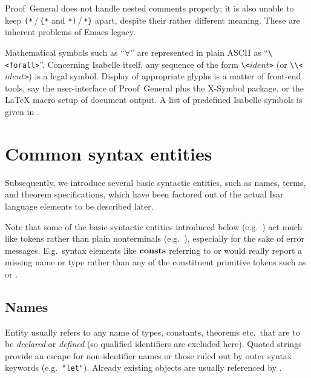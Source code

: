\begin{warn}
  Proof~General does not handle nested comments properly; it is also unable to
  keep \verb,(*,\,/\,\verb,{*, and \verb,*),\,/\,\verb,*}, apart, despite
  their rather different meaning.  These are inherent problems of Emacs
  legacy.
\end{warn}

\medskip

Mathematical symbols such as ``$\forall$'' are represented in plain ASCII as
``\verb,\<forall>,''.  Concerning Isabelle itself, any sequence of the form
\verb,\<,$ident$\verb,>, (or \verb,\\<,$ident$\verb,>,) is a legal symbol.
Display of appropriate glyphs is a matter of front-end tools, say the
user-interface of Proof~General plus the X-Symbol package, or the {\LaTeX}
macro setup of document output.  A list of predefined Isabelle symbols is
given in \cite[appendix~A]{isabelle-sys}.


\section{Common syntax entities}

Subsequently, we introduce several basic syntactic entities, such as names,
terms, and theorem specifications, which have been factored out of the actual
Isar language elements to be described later.

Note that some of the basic syntactic entities introduced below (e.g.\ 
) act much like tokens rather than plain nonterminals (e.g.\ 
), especially for the sake of error messages.  E.g.\ syntax
elements like ${\mathord{\mathbf{consts}}}$ referring to \railqtoken{name} or \railqtoken{type}
would really report a missing name or type rather than any of the constituent
primitive tokens such as \railtoken{ident} or \railtoken{string}.


\subsection{Names}

Entity  usually refers to any name of types, constants,
theorems etc.\ that are to be \emph{declared} or \emph{defined} (so qualified
identifiers are excluded here).  Quoted strings provide an escape for
non-identifier names or those ruled out by outer syntax keywords (e.g.\ 
\verb|"let"|).  Already existing objects are usually referenced by
\railqtoken{nameref}.


